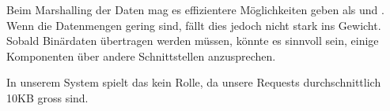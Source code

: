 Beim Marshalling der Daten mag es effizientere Möglichkeiten geben als  und .
Wenn die Datenmengen gering sind, fällt dies jedoch nicht stark ins Gewicht.
Sobald Binärdaten übertragen werden müssen, könnte es sinnvoll sein, einige Komponenten über andere Schnittstellen anzusprechen.

In unserem System spielt das kein Rolle, da unsere Requests durchschnittlich 10KB gross sind.